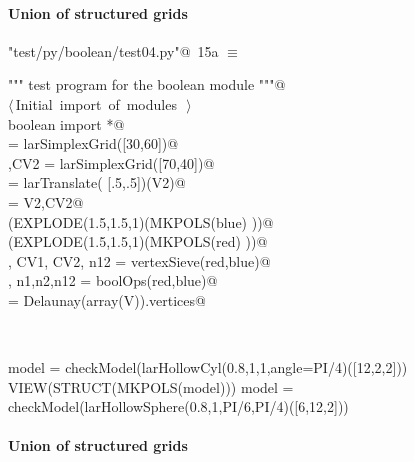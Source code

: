 \documentclass[11pt,oneside]{article}	%
\begin{document}
\paragraph{Union of structured grids}

\begin{flushleft} \small
\begin{minipage}{\linewidth} \label{scrap24}
\protect{}\verb@"test/py/boolean/test04.py"@\nobreak\ {\footnotesize 15a }$\equiv$
\vspace{-1ex}
\begin{list}{}{} \item
\mbox{}\verb@""" test program for the boolean module """@\\
\mbox{}\verb@@\hbox{$\langle\,$Initial import of modules\nobreak\ {\footnotesize {}}$\,\rangle$}\verb@@\\
\mbox{}\verb@from boolean import *@\\
\mbox{}\verb@blue = larSimplexGrid([30,60])@\\
\mbox{},CV2 = larSimplexGrid([70,40])@\\
\mbox{} = larTranslate( [.5,.5])(V2)@\\
\mbox{}\verb@red = V2,CV2@\\
\mbox{}\verb@VIEW(EXPLODE(1.5,1.5,1)(MKPOLS(blue) ))@\\
\mbox{}\verb@VIEW(EXPLODE(1.5,1.5,1)(MKPOLS(red) ))@\\
\mbox{}\verb@V, CV1, CV2, n12 = vertexSieve(red,blue)@\\
\mbox{}\verb@V, n1,n2,n12 = boolOps(red,blue)@\\
\mbox{}\verb@CV = Delaunay(array(V)).vertices@\\
\mbox{}\verb@@{\NWsep}
\end{list}
\vspace{-2ex}
\end{minipage}\\[4ex]
\end{flushleft}


model = checkModel(larHollowCyl(0.8,1,1,angle=PI/4)([12,2,2]))
VIEW(STRUCT(MKPOLS(model)))
model = checkModel(larHollowSphere(0.8,1,PI/6,PI/4)([6,12,2]))


\paragraph{Union of structured grids}
\end{document}

